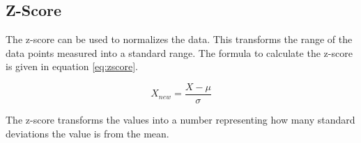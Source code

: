 \subsection{Z-Score}
The z-score can be used to normalizes the data.
This transforms the range of the data points measured into a standard range.
The formula to calculate the z-score is given in equation \ref{eq:zscore}.

\begin{equation}
X_{new} = \frac{X - \mu}{\sigma}
\label{eq:zscore}
\end{equation}


The z-score transforms the values into a number representing how many standard deviations the value is from the mean.
